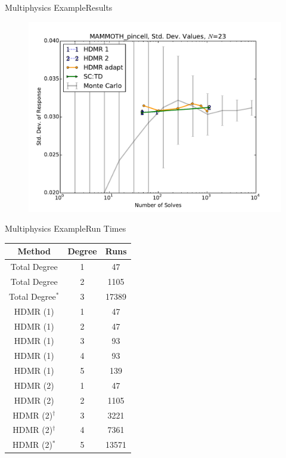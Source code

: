 \documentclass{beamer}
\begin{document}
\begin{frame}{Multiphysics Example}{Results}%
      \begin{figure}
        \centering
        \includegraphics[width=0.8\linewidth]{mammoth/MAMMOTH_pincell_var_vals}
      \end{figure}
\end{frame}

\begin{frame}{Multiphysics Example}{Run Times}%
\begin{table}
\footnotesize
  \centering
  \begin{tabular}{c c|c}
    Method & Degree & Runs \\ \hline
    Total Degree & 1 & 47 \\
    Total Degree & 2 & 1105 \\
    Total Degree$^*$ & 3 & 17389 \\ \hline
    HDMR (1) & 1 & 47 \\
    HDMR (1) & 2 & 47 \\
    HDMR (1) & 3 & 93 \\
    HDMR (1) & 4 & 93 \\
    HDMR (1) & 5 & 139\\ \hline
    HDMR (2) & 1 & 47 \\
    HDMR (2) & 2 & 1105 \\
    HDMR (2)$^\dagger$ & 3 & 3221 \\
    HDMR (2)$^\dagger$ & 4 & 7361 \\
    HDMR (2)$^*$ & 5 & 13571 \\
  \end{tabular}
\end{table}
\end{frame}
\end{document}
